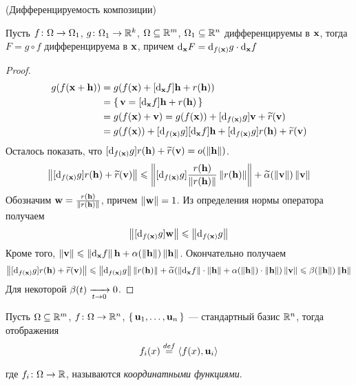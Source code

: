 \begin{theorem}(Дифференцируемость композиции)

    Пусть $f \colon \O \to \O_{1}$, $g \colon \O_{1} \to \Rk$, $\O \subseteq
    \Rm$, $\O_{1} \subseteq \Rn$ дифференцируемы в $\x$, тогда $F = g \circ f$
    дифференцируема в $\x$, причем $\der{F}{\x} = \der{g}{f(\x)} \cdot
    \der{f}{\x}$
\end{theorem}
\begin{proof}
    \begin{align*}
        g(f(\x + \h)) &= g(f(\x) + [\der{f}{\x}]\h + r(\h)) \\
        &= \{\, \ev = [\der{f}{\x}]\h + r(\h) \,\} \\
        &= g(f(\x) + \ev) = g(f(\x)) + [\der{g}{f(\x)}]\ev + \widetilde{r}(\ev) \\
        &= g(f(\x)) + [\der{g}{f(\x)}][\der{f}{\x}]\h + [\der{g}{f(\x)}]r(\h) +
        \widetilde{r}(\ev) \\
    \end{align*}
    Осталось показать, что $[\der{g}{f(\x)}]r(\h) + \widetilde{r}(\ev) =
    o(\norm{\h})$.
\[
    \norm{[\der{g}{f(\x)}]r(\h) + \widetilde{r}(\ev)} \leqslant
    \norm{[\der{g}{f(\x)}]\frac{r(\h)}{\norm{r(\h)}}\norm{r(\h)}} +
    \widetilde{\a}(\norm{\ev})\norm{\ev}
\]
    Обозначим $\w = \frac{r(\h)}{\norm{r(\h)}}$, причем $\norm{\w} = 1$.
    Из определения нормы оператора получаем
\[
    \norm{[\der{g}{f(\x)}]\w} \leqslant \norm{\der{g}{f(\x)}}
\]
    Кроме того, $\norm{\ev} \leqslant \norm{\der{f}{\x}}\h +
    \a(\norm{\h})\norm{\h}$. Окончательно получаем
\[
    \norm{[\der{g}{f(\x)}]r(\h) + \widetilde{r}(\ev)} \leqslant
    \norm{\der{g}{f(\x)}}\norm{r(\h)} + \widetilde{\a}(\norm{\der{f}{\x}} \cdot
    \norm{\h} + \a(\norm{\h}) \cdot \norm{\h})\norm{\ev} \leqslant
    \b(\norm{\h})\norm{\h}
\]
    Для некоторой $\b(t) \xrightarrow[t \to 0]{} 0$.
\end{proof}

\begin{definition}
    Пусть $\O \subseteq \Rm$, $f \colon \O \to \Rn$, $\{\, \elemvec{u}_1, \ldots,
    \elemvec{u}_n \,\}$ --- стандартный базис $\Rn$, тогда отображения
\[
    f_i(x) \defeq \langle f(x), \elemvec{u}_i \rangle
\]
    где $f_i \colon \O \to \R$, называются \textit{координатными функциями}.
\end{definition}

